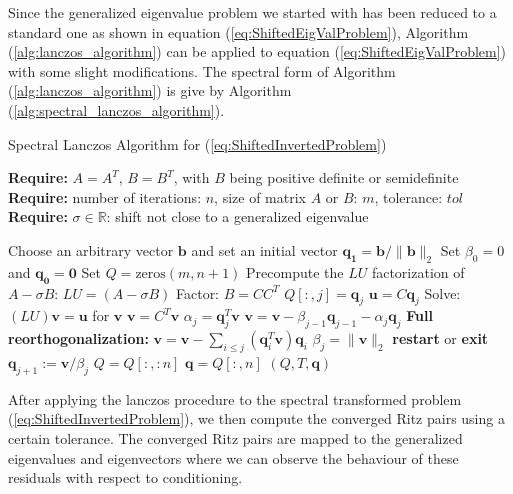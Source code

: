 Since the generalized eigenvalue problem we started with has been reduced to a standard one as shown in equation (\ref{eq:ShiftedEigValProblem}), Algorithm (\ref{alg:lanczos_algorithm}) can be applied to equation (\ref{eq:ShiftedEigValProblem}) with some slight modifications. The spectral form of Algorithm (\ref{alg:lanczos_algorithm}) is give by Algorithm (\ref{alg:spectral_lanczos_algorithm}).
\begin{algorithm}
	\caption{Spectral Lanczos Algorithm for (\ref{eq:ShiftedInvertedProblem}) }
	\label{alg:spectral_lanczos_algorithm}
	
	\textbf{Require:} \( A = A^T \), \( B = B^T \), with \(B\) being positive definite or semidefinite\\
	\textbf{Require:} number of iterations: \(n\), size of matrix $A$ or $B$: $m$, tolerance: \(tol\)\\
	\textbf{Require:} \(\sigma \in \mathbb{R}\): shift not close to a generalized eigenvalue
	\begin{algorithmic}[1]
		\State Choose an arbitrary vector $\mathbf{b}$ and set an initial vector $\mathbf{q_1} = \mathbf{b}/ \|\mathbf{b}\|_2$
		\State Set $\beta_0 = 0$ and $\mathbf{q_0} = \mathbf{0}$
		\State Set $Q = \text{zeros}(m, n+1)$
		\State Precompute the $LU$ factorization of $A - \sigma B$: $LU = (A - \sigma B)$
		\State Factor: $B = CC^T$
		\State $Q[:, j] = \mathbf{q}_j$
		\State $\mathbf{u} = C\mathbf{q}_j$
		\State Solve: $(LU)\mathbf{v} = \mathbf{u}$ for $\mathbf{v}$
		\State $\mathbf{v} = C^T \mathbf{v}$
		\State $\alpha_j = \mathbf{q}_j^T \mathbf{v} $
		\State $\mathbf{v} = \mathbf{v} - \beta_{j-1}\mathbf{q}_{j-1} - \alpha_j \mathbf{q}_j$
		\State \textbf{Full reorthogonalization:} $\mathbf{v} = \mathbf{v} - \sum_{i \leq j} (\mathbf{q}_i^T \mathbf{v}) \mathbf{q}_i$
		\State $\beta_{j} = \|\mathbf{v}\|_2$
		\State \textbf{restart} or \textbf{exit}
		\EndIf
		\State $\mathbf{q}_{j+1} := \mathbf{v} / \beta_{j}$
		\EndIf
		\EndFor
		\State $Q = Q[:, :n]$
		\State $\mathbf{q} = Q[:, n]$
		\State \Return $(Q, T, \mathbf{q})$
		\EndFunction
	\end{algorithmic}
\end{algorithm}
After applying the lanczos procedure to the spectral transformed problem (\ref{eq:ShiftedInvertedProblem}), we then compute the converged Ritz pairs using a certain tolerance. The converged Ritz pairs are mapped to the generalized eigenvalues and eigenvectors where we can observe the behaviour of these residuals with respect to conditioning.

